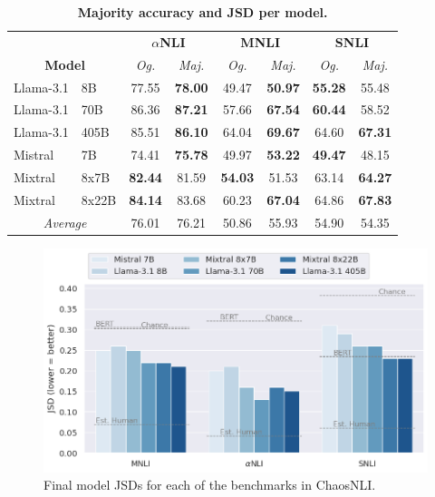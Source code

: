 \begin{table}
    \centering
    \begin{tabular}{llcccccc}
        & & \multicolumn{2}{c}{\textbf{$\alpha$NLI}} & \multicolumn{2}{c}{\textbf{MNLI}} & \multicolumn{2}{c}{\textbf{SNLI}} \\
        \multicolumn{2}{c}{\textbf{Model}} & \textit{Og.} & \textit{Maj.} & \textit{Og.} & \textit{Maj.} & \textit{Og.} & \textit{Maj.}\\
        \toprule
        Llama-3.1 & 8B & 77.55 & \textbf{78.00} & 49.47 & \textbf{50.97} & \textbf{55.28} & 55.48 \\
        Llama-3.1 & 70B & 86.36 & \textbf{87.21} & 57.66 & \textbf{67.54} & \textbf{60.44} & 58.52 \\
        Llama-3.1 & 405B & 85.51 & \textbf{86.10} & 64.04 & \textbf{69.67} & 64.60 & \textbf{67.31} \\
        \midrule
        Mistral & 7B & 74.41 & \textbf{75.78} & 49.97 & \textbf{53.22} & \textbf{49.47} & 48.15 \\
        Mixtral & 8x7B & \textbf{82.44} & 81.59 & \textbf{54.03} & 51.53 & 63.14 & \textbf{64.27} \\
        Mixtral & 8x22B & \textbf{84.14} & 83.68 & 60.23 & \textbf{67.04} & 64.86 & \textbf{67.83} \\
        \midrule
        \multicolumn{2}{c}{\emph{Average}} & 76.01 & 76.21 & 50.86 & 55.93 & 54.90 & 54.35 \\
    \bottomrule
    \end{tabular}
\caption{\textbf{Majority accuracy and JSD per model.} }
\label{tab:chaos_acc}
\end{table}

\begin{figure}
    \centering
    \includegraphics[width=0.6\linewidth]{figures/jsd_all_benchmarks}
    \caption{Final model JSDs for each of the benchmarks in ChaosNLI.}
    \label{fig:jsd_all_benchmarks}
\end{figure}

